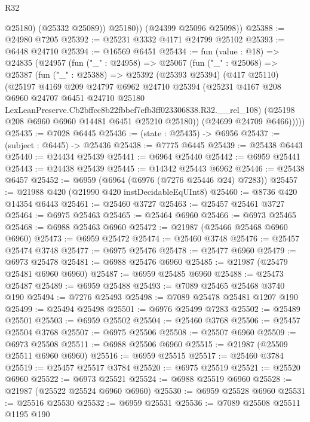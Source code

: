 \begin{lexlean}{R32}
\begin{coremodule}
              @25180)
            (@25332 @25089))
          @25180))
      (@24399 @25096 @25098))
@25388 := @24980 @7205
@25392 := @25231 @3332 @4171 @24799 @25102
@25393 := @6448 @24710
@25394 := @16569 @6451
@25434 := fun (value : @18) =>
  @24835
    (@24957
      (fun ("_" : @24958) =>
      @25067
        (fun ("_" : @25068) =>
        @25387
          (fun ("_" : @25388) =>
          @25392
            (@25393 @25394)
            (@417 @25110)
            (@25197
              @4169
              @209
              @24797
              @6962
              @24710
              @25394
              (@25231
                @4167
                @208
                @6960
                @24707
                @6451
                @24710
                @25180
                LexLeanPreserve.Cb2bffcc8b22fbbef7efb3ff023306838.R32.__rel_108)
              (@25198 @208 @6960 @6960 @14481 @6451 @25210 @25180))
            (@24699 @24709 @6466)))))
@25435 := @7028 @6445
@25436 := (state : @25435) -> @6956
@25437 := (subject : @6445) -> @25436
@25438 := @7775 @6445
@25439 := @25438 @6443
@25440 := @24434 @25439
@25441 := @6964 @25440
@25442 := @6959 @25441
@25443 := @24438 @25439
@25445 := @14342 @25443 @6962
@25446 := @25438 @6457
@25452 := @6959 (@6964 (@6976 (@7276 @25446 @24) @7283))
@25457 := @21988 @420 (@21990 @420 instDecidableEqUInt8)
@25460 := @8736 @420 @14354 @6443
@25461 := @25460 @3727
@25463 := @25457 @25461 @3727
@25464 := @6975 @25463
@25465 := @25464 @6960
@25466 := @6973 @25465
@25468 := @6988 @25463 @6960
@25472 := @21987 (@25466 @25468 @6960 @6960)
@25473 := @6959 @25472
@25474 := @25460 @3748
@25476 := @25457 @25474 @3748
@25477 := @6975 @25476
@25478 := @25477 @6960
@25479 := @6973 @25478
@25481 := @6988 @25476 @6960
@25485 := @21987 (@25479 @25481 @6960 @6960)
@25487 := @6959 @25485 @6960
@25488 := @25473 @25487
@25489 := @6959 @25488
@25493 := @7089 @25465 @25468 @3740 @190
@25494 := @7276 @25493
@25498 := @7089 @25478 @25481 @1207 @190
@25499 := @25494 @25498
@25501 := @6976 @25499 @7283
@25502 := @25489 @25501
@25503 := @6959 @25502
@25504 := @25460 @3768
@25506 := @25457 @25504 @3768
@25507 := @6975 @25506
@25508 := @25507 @6960
@25509 := @6973 @25508
@25511 := @6988 @25506 @6960
@25515 := @21987 (@25509 @25511 @6960 @6960)
@25516 := @6959 @25515
@25517 := @25460 @3784
@25519 := @25457 @25517 @3784
@25520 := @6975 @25519
@25521 := @25520 @6960
@25522 := @6973 @25521
@25524 := @6988 @25519 @6960
@25528 := @21987 (@25522 @25524 @6960 @6960)
@25530 := @6959 @25528 @6960
@25531 := @25516 @25530
@25532 := @6959 @25531
@25536 := @7089 @25508 @25511 @1195 @190

\end{coremodule}
\end{lexlean}
